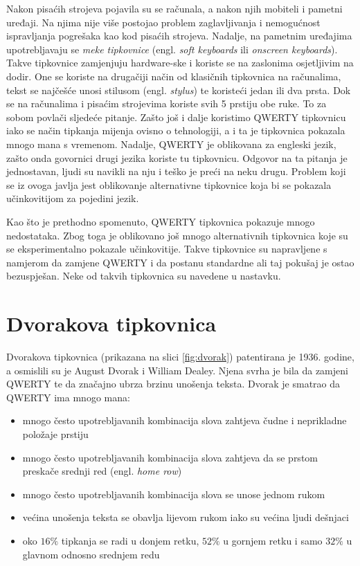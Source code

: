 \documentclass[times, utf8, zavrsni, numeric]{fer}
\begin{document}
Nakon pisaćih strojeva pojavila su se računala, a nakon njih mobiteli i pametni uređaji. Na njima nije više postojao problem zaglavljivanja i nemogućnost ispravljanja pogrešaka kao kod pisaćih strojeva. Nadalje, na pametnim uređajima upotrebljavaju se \emph{meke tipkovnice} (engl. \emph{soft keyboards} ili \emph{onscreen keyboards}). Takve tipkovnice zamjenjuju hardware-ske i koriste se na zaslonima osjetljivim na dodir. One se koriste na drugačiji način od klasičnih tipkovnica na računalima, tekst se najčešće unosi stilusom (engl. \emph{stylus}) te koristeći jedan ili dva prsta. Dok se na računalima i pisaćim strojevima koriste svih 5 prstiju obe ruke. To za sobom povlači sljedeće pitanje. Zašto još i dalje koristimo QWERTY tipkovnicu iako se način tipkanja mijenja ovisno o tehnologiji, a i ta je tipkovnica pokazala mnogo mana s vremenom. Nadalje, QWERTY je oblikovana za engleski jezik, zašto onda govornici drugi jezika koriste tu tipkovnicu. Odgovor na ta pitanja je jednostavan, ljudi su navikli na nju i teško je preći na neku drugu. Problem koji se iz ovoga javlja jest oblikovanje alternativne tipkovnice koja bi se pokazala učinkovitijom za pojedini jezik.

Kao što je prethodno spomenuto, QWERTY tipkovnica pokazuje mnogo nedostataka. Zbog toga je oblikovano još mnogo alternativnih tipkovnica koje su se eksperimentalno pokazale učinkovitije. Takve tipkovnice su napravljene s namjerom da zamjene QWERTY i da postanu standardne ali taj pokušaj je ostao bezuspješan. Neke od takvih tipkovnica su navedene u nastavku.

\section{Dvorakova tipkovnica}
Dvorakova tipkovnica (prikazana na slici \ref{fig:dvorak}) patentirana je 1936. godine, a osmislili su je August Dvorak i William Dealey. Njena svrha je bila da zamjeni QWERTY te da značajno ubrza brzinu unošenja teksta. Dvorak je smatrao da QWERTY ima mnogo mana:

\begin{itemize}
\item mnogo često upotrebljavanih kombinacija slova zahtjeva čudne i neprikladne položaje prstiju
\item mnogo često upotrebljavanih kombinacija slova zahtjeva da se prstom preskače srednji red (engl. \emph{home row})
\item mnogo često upotrebljavanih kombinacija slova se unose jednom rukom
\item većina unošenja teksta se obavlja lijevom rukom iako su većina ljudi dešnjaci
\item oko $16\%$ tipkanja se radi u donjem retku, $52\%$ u gornjem retku i samo $32\%$ u glavnom odnosno srednjem redu
\end{itemize}
\end{document}
